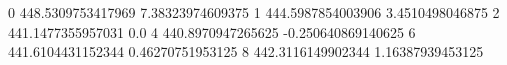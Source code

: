 0 448.5309753417969 7.38323974609375
1 444.5987854003906 3.4510498046875
2 441.1477355957031 0.0
4 440.8970947265625 -0.250640869140625
6 441.6104431152344 0.46270751953125
8 442.3116149902344 1.16387939453125
